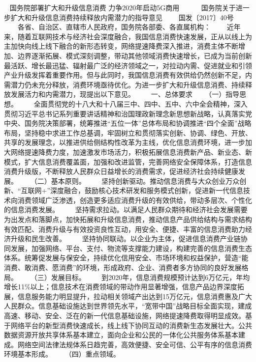 \documentclass[11pt]{ctexart}
\begin{document}
{{{{ 
国务院部署扩大和升级信息消费 力争2020年启动5G商用
 
　　国务院关于进一步扩大和升级信息消费持续释放内需潜力的指导意见
　　国发〔2017〕40号
　　各省、自治区、直辖市人民政府，国务院各部委、各直属机构：
　　近年来，随着互联网技术与经济社会深度融合，我国信息消费快速发展，正从以线上为主加快向线上线下融合的新形态转变，网络提速降费深入推进，消费主体不断增加、边界逐渐拓展、模式深刻调整，带动其他领域消费快速增长，已成为当前创新最活跃、增长最迅猛、辐射最广泛的经济领域之一，对拉动内需、促进就业和引领产业升级发挥着重要作用。但与此同时，我国信息消费有效供给仍然创新不足，内需潜力仍未充分释放，消费环境亟待优化。为进一步扩大和升级信息消费、持续释放发展活力和内需潜力，现提出以下意见。
　　一、总体要求
　　（一）指导思想。
　　全面贯彻党的十八大和十八届三中、四中、五中、六中全会精神，深入贯彻习近平总书记系列重要讲话精神和治国理政新理念新思想新战略，认真落实党中央、国务院决策部署，统筹推进“五位一体”总体布局和协调推进“四个全面”战略布局，坚持稳中求进工作总基调，牢固树立和贯彻落实创新、协调、绿色、开放、共享的发展理念，以推进供给侧结构性改革为主线，优化信息消费环境，进一步加大网络提速降费力度，加速激发市场活力，积极拓展信息消费新产品、新业态、新模式，扩大信息消费覆盖面，加强和改进监管，完善网络安全保障体系，打造信息消费升级版，不断释放人民群众日益增长的消费需求，促进经济社会持续健康发展。
　　（二）基本原则。
　　坚持创新驱动。推动信息消费与大众创业万众创新、“互联网+”深度融合，鼓励核心技术研发和服务模式创新，促进新一代信息技术向消费领域广泛渗透，创造更多适应消费升级的有效供给，带动多层次、个性化的信息消费发展。
　　坚持需求拉动。以满足人民群众期待和经济社会发展需要为出发点和落脚点，加快拓展和升级信息消费，推动信息产品供给结构与需求结构有效匹配、消费升级与有效投资良性互动，用安全、便捷、丰富的信息消费助力经济升级和民生改善。
　　坚持协同联动。以企业为主体，促进信息消费产业链协同发展，加强网络、平台、支付、物流等支撑能力建设，构建完善的信息消费生态体系。统筹促发展与保安全，持续优化信用安全、市场环境和权益保护，营造“能消费、敢消费、愿消费”的环境，形成政府、企业、消费者多方协同的良好发展格局。
　　（三）发展目标。
　　到2020年，信息消费规模预计达到6万亿元，年均增长11\%以上；信息技术在消费领域的带动作用显著增强，信息产品边界深度拓展，信息服务能力明显提升，拉动相关领域产出达到15万亿元，信息消费惠及广大人民群众。信息基础设施达到世界领先水平，“宽带中国”战略目标全面实现，建成高速、移动、安全、泛在的新一代信息基础设施，网络提速降费取得明显成效。基于网络平台的新型消费快速成长，线上线下协同互动的消费新生态发展壮大。公共数据资源开放共享体系基本建立，面向企业和公民的一体化公共服务体系基本建成。网络空间法律法规体系日趋完善，高效便捷、安全可信、公平有序的信息消费环境基本形成。
　　（四）重点领域。
}}}}
\end{document}
